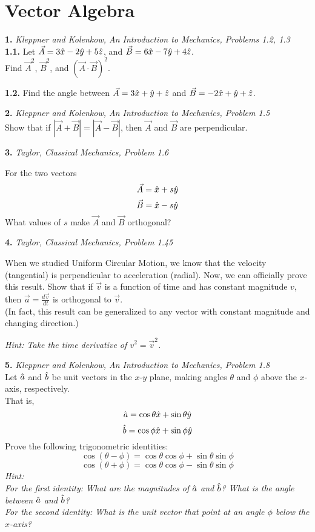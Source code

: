 \documentclass[11pt]{article}
\theoremstyle{gangnamstyle}{\newtheorem{definition}{Definition}[]}
\theoremstyle{gangnamstyle}{\newtheorem{example}{Example}[]}
\theoremstyle{gangnamstyle}{\newtheorem{problem}{Problem}[]}
\begin{document}
\section{Vector Algebra}

\textbf{1.} \textit{Kleppner and Kolenkow, An Introduction to Mechanics, Problems 1.2, 1.3} \\ 
\textbf{1.1.} Let $\Vec{A} = 3\Hat{x} - 2\Hat{y} + 5\Hat{z}$, and $\Vec{B} = 6\Hat{x} - 7\Hat{y} + 4\Hat{z}$. \\
Find $\Vec{A}^2$, $\Vec{B}^2$, and $(\Vec{A} \cdot \Vec{B})^2$. 

\vspace{2.5 in}

\textbf{1.2.} Find the angle between $\Vec{A} = 3\Hat{x} + \Hat{y} + \Hat{z}$ and $\Vec{B} = -2 \Hat{x} + \Hat{y} + \Hat{z}$. 

\pagebreak

\textbf{2.} \textit{Kleppner and Kolenkow, An Introduction to Mechanics, Problem 1.5} \\
Show that if $|\Vec{A} + \Vec{B}| = |\Vec{A} - \Vec{B}|$, then $\Vec{A}$ and $\Vec{B}$ are perpendicular.

\pagebreak

\textbf{3.} \textit{Taylor, Classical Mechanics, Problem 1.6} 

For the two vectors
\[ \Vec{A} = \Hat{x} + s\Hat{y} \]
\[ \Vec{B} = \Hat{x} - s\Hat{y} \]
What values of $s$ make $\Vec{A}$ and $\Vec{B}$ orthogonal? 

\pagebreak

\textbf{4.} \textit{Taylor, Classical Mechanics, Problem 1.45} 

When we studied Uniform Circular Motion, we know that the velocity (tangential) is perpendicular to acceleration (radial). Now, we can officially prove this result. Show that if $\Vec{v}$ is a function of time and has constant magnitude $v$, then $\Vec{a} = \frac{d\Vec{v}}{dt}$ is orthogonal to $\Vec{v}$. \\
(In fact, this result can be generalized to any vector with constant magnitude and changing direction.)

\textit{Hint: Take the time derivative of $v^2 = \Vec{v}^2$.}

\pagebreak

\textbf{5.} \textit{Kleppner and Kolenkow, An Introduction to Mechanics, Problem 1.8} \\
Let $\Hat{a}$ and $\Hat{b}$ be unit vectors in the $x$-$y$ plane, making angles $\theta$ and $\phi$ above the $x$-axis, respectively. \\
That is, 
\[ \Hat{a} = \cos\theta \Hat{x} + \sin\theta \Hat{y} \]
\[ \Hat{b} = \cos\phi \Hat{x} + \sin\phi \Hat{y} \]
Prove the following trigonometric identities:
\[ \cos(\theta - \phi) = \cos\theta\cos\phi + \sin\theta\sin\phi \]
\[ \cos(\theta + \phi) = \cos\theta\cos\phi - \sin\theta\sin\phi \]
\textit{Hint: \\
For the first identity: What are the magnitudes of $\Hat{a}$ and $\Hat{b}$? What is the angle between $\Hat{a}$ and $\Hat{b}$? \\
For the second identity: What is the unit vector that point at an angle $\phi$ below the $x$-axis? }
\end{document}
